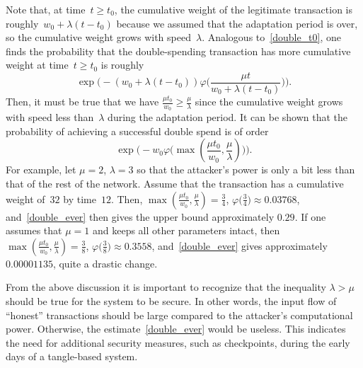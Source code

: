 \documentclass[12pt]{article}
\let\phi=\varphi
\begin{document}
\begin{CJK}{UTF8}{bkai}
Note that, at time~$t\geq t_0$, the cumulative weight
of the legitimate transaction is roughly~$w_0+\lambda (t-t_0)$
because we assumed that the adaptation period is over,
so the cumulative weight grows with speed~$\lambda$.
Analogous to~\eqref{double_t0}, 
one finds the probability that the double-spending transaction
has more cumulative weight at time~$t\geq t_0$ is roughly
\begin{equation}
\label{double_t}
 \exp\big(-(w_0+\lambda (t-t_0))
\phi\big(\textstyle\frac{\mu t}{w_0+\lambda (t-t_0)}\big)\big).
\end{equation}
Then, it must be true that we have $\frac{\mu t_0}{w_0}\geq 
\frac{\mu}{\lambda}$ since the cumulative weight grows with 
speed less than~$\lambda $ during the adaptation period. 
It can be shown that the probability 
of achieving a successful double spend is of order
\begin{equation}
\label{double_ever}
 \exp\big(-w_0\phi\big(\max(\textstyle\frac{\mu t_0}{w_0},
\frac{\mu}{\lambda})\big)\big).
\end{equation}
For example, let $\mu=2$, $\lambda=3$
so that the attacker's power is only a bit less than
that of the rest of the network. Assume that the 
transaction has a cumulative weight of~$32$ by time~$12$.
Then, $\max(\frac{\mu t_0}{w_0},\frac{\mu}{\lambda}) = \frac{3}{4}$,
$\phi\big(\frac{3}{4}\big)\approx 0.03768$,
and~\eqref{double_ever} then gives the upper bound 
approximately $0.29$. If one assumes that
$\mu=1$ and keeps all other parameters intact, then
$\max(\frac{\mu t_0}{w_0},\frac{\mu}{\lambda}) = \frac{3}{8}$,
$\phi\big(\frac{3}{8}\big)\approx 0.3558$,
and~\eqref{double_ever} gives approximately $0.00001135$,
quite a drastic change.


 From the above discussion it is important to recognize that 
 the inequality $\lambda > \mu$ should be true for the 
 system to be secure. 
In other words, the input flow of ``honest''
transactions should be large compared to the 
attacker's computational power. Otherwise, 
the estimate~\eqref{double_ever} would be useless. 
This indicates the need
for additional security measures, such as checkpoints,
during the early days of a tangle-based system.



\end{CJK}
\end{document}
